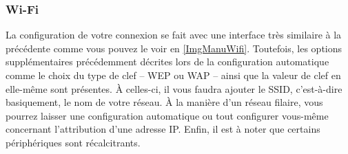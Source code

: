 {\subsubsection{Wi-Fi}
La configuration de votre connexion  se fait avec une interface très similaire à la précédente comme vous pouvez le voir en \ref{ImgManuWifi}. Toutefois, les options supplémentaires précédemment décrites lors de la configuration automatique comme le choix du type de clef -- WEP ou WAP -- ainsi que la valeur de clef en elle-même sont présentes. À celles-ci, il vous faudra ajouter le SSID, c'est-à-dire basiquement, le nom de votre réseau. À la manière d'un réseau filaire, vous pourrez laisser une configuration automatique ou tout configurer vous-même concernant l'attribution d'une adresse IP. Enfin, il est à noter que certains périphériques  sont récalcitrants.
\GestionReseauManuel
}
